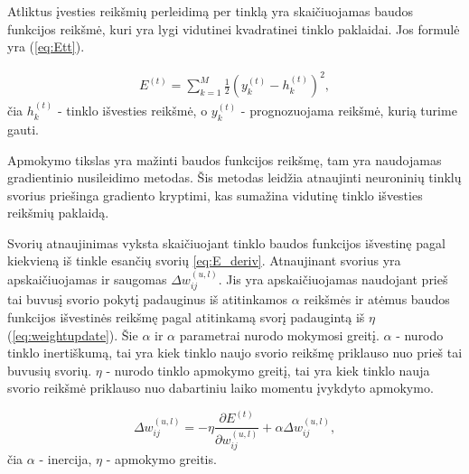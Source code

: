 Atliktus įvesties reikšmių perleidimą per tinklą yra skaičiuojamas baudos funkcijos reikšmė, kuri yra lygi vidutinei kvadratinei tinklo paklaidai. Jos formulė yra (\ref{eq:Ett}).

%

\begin{equation} \label{eq:Ett}
  \begin{aligned}
  E^{(t)} = \sum_{k=1}^{M} \frac{1}{2}(y_k^{(t)} - h_k^{(t)})^{2},
  \end{aligned}
\end{equation}
čia $h_k^{(t)}$ - tinklo išvesties reikšmė, o $y_k^{(t)}$ - prognozuojama reikšmė, kurią turime gauti.

Apmokymo tikslas yra mažinti baudos funkcijos reikšmę, tam yra naudojamas gradientinio nusileidimo metodas. Šis metodas leidžia atnaujinti neuroninių tinklų svorius priešinga gradiento kryptimi, kas sumažina vidutinę tinklo išvesties reikšmių paklaidą.

 Svorių atnaujinimas vyksta skaičiuojant tinklo baudos funkcijos išvestinę pagal kiekvieną iš tinkle esančių svorių \ref{eq:E_deriv}. Atnaujinant svorius yra apskaičiuojamas ir saugomas $\Delta w_{ij}^{(u,l)}$. Jis yra apskaičiuojamas naudojant prieš tai buvusį svorio pokytį padauginus iš atitinkamos $\alpha$ reikšmės ir atėmus baudos funkcijos išvestinės reikšmę pagal atitinkamą svorį padaugintą iš $\eta$ (\ref{eq:weightupdate}). Šie $\alpha $ ir $\alpha$ parametrai nurodo mokymosi greitį. $\alpha$ - nurodo tinklo inertiškumą, tai yra kiek tinklo naujo svorio reikšmę priklauso nuo prieš tai buvusių svorių. $\eta$ - nurodo tinklo apmokymo greitį, tai yra kiek tinklo nauja svorio reikšmė priklauso nuo dabartiniu laiko momentu įvykdyto apmokymo.


\begin{equation}\label{eq:weightupdate}
  \Delta w_{ij}^{(u,l)} = -\eta\frac{\partial E^{(t)}}{\partial w_{ij}^{(u,l)}} + \alpha\Delta w_{ij}^{(u,l)},
\end{equation}
čia $\alpha$ - inercija, $\eta$ - apmokymo greitis.


